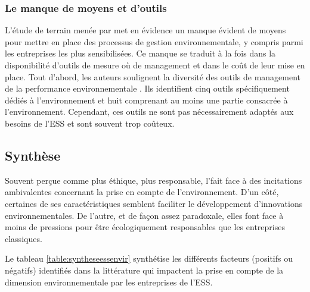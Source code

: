         \subsubsection{Le manque de moyens et d’outils}
            L’étude de terrain menée par \textcite{edwards2013environmental} met en évidence un manque évident de moyens pour mettre en place des processus de gestion environnementale, y compris parmi les entreprises les plus sensibilisées. Ce manque se traduit à la fois dans la disponibilité d’outils de mesure où de management et dans le coût de leur mise en place. Tout d’abord, les auteurs soulignent la diversité des outils de management de la performance environnementale \parencite{edwards2010mainstreaming}. Ils identifient cinq outils spécifiquement dédiés à l’environnement et huit comprenant au moins une partie consacrée à l’environnement. Cependant, ces outils ne sont pas nécessairement adaptés aux besoins de l’ESS et sont souvent trop coûteux.

    \subsection{Synthèse}

        Souvent perçue comme plus éthique, plus responsable, l’\ess  fait face à des incitations ambivalentes concernant la prise en compte de l’environnement. D’un côté, certaines de ses caractéristiques semblent faciliter le développement d’innovations environnementales. De l’autre, et de façon assez paradoxale, elles font face à moins de pressions pour être écologiquement responsables que les entreprises classiques.

        Le tableau \ref{table:syntheseessenvir} synthétise les différents facteurs (positifs ou négatifs) identifiés dans la littérature qui impactent la prise en compte de la dimension environnementale par les entreprises de l’ESS.

